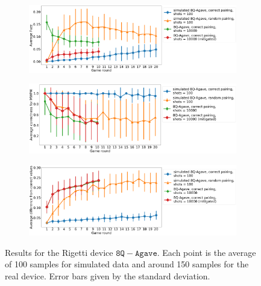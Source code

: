 \documentclass[aps,prl,twocolumn,showpacs,preprintnumbers]{revtex4-1}
\begin{document}
\begin{figure}
	\centering
	\begin{subfigure}[b]{\textwidth}
		\includegraphics[width=\textwidth]{figures/agave_fuzz.png}
	\end{subfigure}
	\begin{subfigure}[b]{\textwidth}
		\includegraphics[width=\textwidth]{figures/agave_mwpm.png}
	\end{subfigure}
	\begin{subfigure}[b]{\textwidth}
		\includegraphics[width=\textwidth]{figures/agave_diff.png}
	\end{subfigure}
	\caption{Results for the Rigetti device $\mathtt{8Q-Agave}$. Each point is the average of 100 samples for simulated data and around 150 samples for the real device. Error bars given by the standard deviation.}\label{fig:agave}
\end{figure}
\pagebreak
\end{document}

